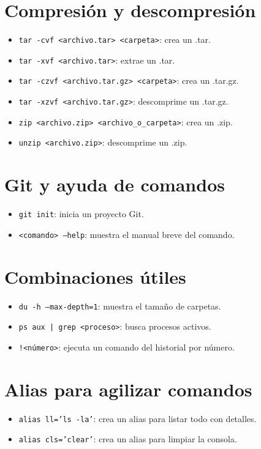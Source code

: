 \documentclass{article}
\begin{document}
\section{Compresión y descompresión}
\begin{itemize}
    \item \texttt{tar -cvf <archivo.tar> <carpeta>}: crea un .tar.
    \item \texttt{tar -xvf <archivo.tar>}: extrae un .tar.
    \item \texttt{tar -czvf <archivo.tar.gz> <carpeta>}: crea un .tar.gz.
    \item \texttt{tar -xzvf <archivo.tar.gz>}: descomprime un .tar.gz.
    \item \texttt{zip <archivo.zip> <archivo\_o\_carpeta>}: crea un .zip.
    \item \texttt{unzip <archivo.zip>}: descomprime un .zip.
\end{itemize}



\section{Git y ayuda de comandos}
\begin{itemize}
    \item \texttt{git init}: inicia un proyecto Git.
    \item \texttt{<comando> --help}: muestra el manual breve del comando.
\end{itemize}

\section{Combinaciones útiles}
\begin{itemize}
    \item \texttt{du -h --max-depth=1}: muestra el tamaño de carpetas.
    \item \texttt{ps aux | grep <proceso>}: busca procesos activos.
    \item \texttt{!<número>}: ejecuta un comando del historial por número.
\end{itemize}

\section{Alias para agilizar comandos}
\begin{itemize}
    \item \texttt{alias ll='ls -la'}: crea un alias para listar todo con detalles.
    \item \texttt{alias cls='clear'}: crea un alias para limpiar la consola.
\end{itemize}
\end{document}
